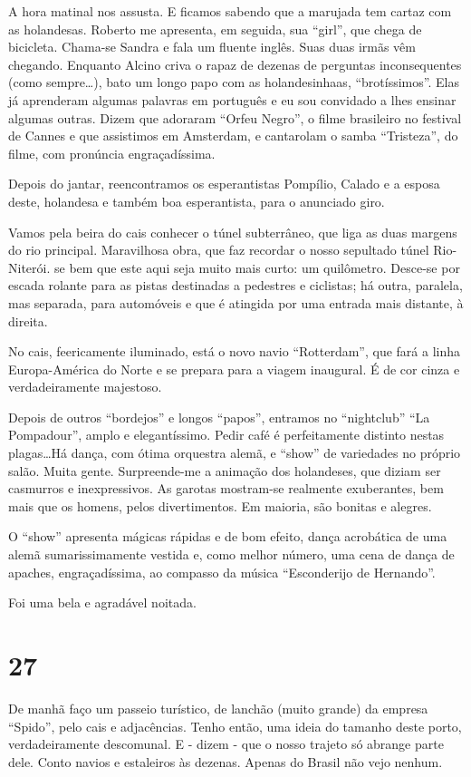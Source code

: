 A hora matinal nos assusta. E ficamos sabendo que a marujada tem cartaz com as holandesas. Roberto me apresenta, em seguida, sua “girl”, que chega de bicicleta. Chama-se Sandra e fala um fluente inglês. Suas duas irmãs vêm chegando. Enquanto Alcino criva o rapaz de dezenas de perguntas inconsequentes (como sempre\ldots), bato um longo papo com as holandesinhaas, “brotíssimos”. Elas já aprenderam algumas palavras em português e eu sou convidado a lhes ensinar algumas outras. Dizem que adoraram “Orfeu Negro”, o filme brasileiro no festival de Cannes e que assistimos em Amsterdam, e cantarolam o samba “Tristeza”, do filme, com pronúncia engraçadíssima.

Depois do jantar, reencontramos os esperantistas Pompílio, Calado e a esposa deste, holandesa e também boa esperantista, para o anunciado giro.

Vamos pela beira do cais conhecer o túnel subterrâneo, que liga as duas margens do rio principal. Maravilhosa obra, que faz recordar o nosso sepultado túnel Rio-Niterói. se bem que este aqui seja muito mais curto: um quilômetro. Desce-se por escada rolante para as pistas destinadas a pedestres e ciclistas; há outra, paralela, mas separada, para automóveis e que é atingida por uma entrada mais distante, à direita.

No cais, feericamente iluminado, está o novo navio “Rotterdam”, que fará a linha Europa-América do Norte e se prepara para a viagem inaugural. É de cor cinza e verdadeiramente majestoso.

Depois de outros “bordejos” e longos “papos”, entramos no “nightclub” “La Pompadour”, amplo e elegantíssimo. Pedir café é perfeitamente distinto nestas plagas\ldots Há dança, com ótima orquestra alemã, e “show” de variedades no próprio salão. Muita gente. Surpreende-me a animação dos holandeses, que diziam ser casmurros e inexpressivos. As garotas mostram-se realmente exuberantes, bem mais que os homens, pelos divertimentos. Em maioria, são bonitas e alegres.

O “show” apresenta mágicas rápidas e de bom efeito, dança acrobática de uma alemã sumarissimamente vestida e, como melhor número, uma cena de dança de apaches, engraçadíssima, ao compasso da música “Esconderijo de Hernando”.

Foi uma bela e agradável noitada.

\section*{27 \adfflatleafright {}}
De manhã faço um passeio turístico, de lanchão (muito grande) da empresa “Spido”, pelo cais e adjacências. Tenho então, uma ideia do tamanho deste porto, verdadeiramente descomunal. E - dizem - que o nosso trajeto só abrange parte dele. Conto navios e estaleiros às dezenas. Apenas do Brasil não vejo nenhum.

